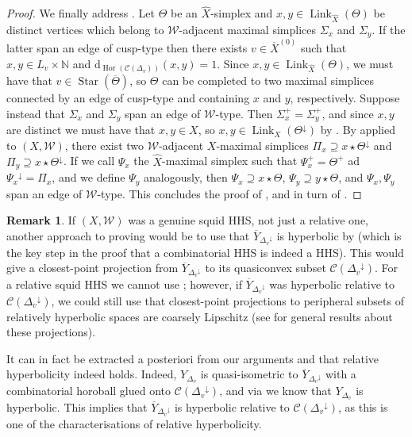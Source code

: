 \documentclass[svgnames]{amsart}
\theoremstyle{plain}
\theoremstyle{definition}
\newtheorem{rem}[thm]{Remark}
\newcommand{\C}[1]{\mathcal{C}(#1)}
\newcommand{\dist}{\mathrm{d}}
\newcommand{\link}[2]{\operatorname{Link}_{#1}\left(#2\right)}
\newcommand{\W}{\mathcal{W}}
\newcommand{\CStar}[1]{\operatorname{Star}\left(#1\right)}
\newcommand{\Hor}[1]{\operatorname{Hor}\left(#1\right)}
\newcommand{\down}[1]{{#1}^{\downarrow}}
\newcommand{\squid}[1]{squid}
\newcommand{\N}{\mathbb{N}}
\renewcommand{\hat}{\widehat}
\newcommand{\ov}[1]{\overline{#1}}
\begin{document}
\begin{proof}
We finally address . Let $\Theta$ be an $\hat X$-simplex and $x,y\in \link{\hat X}{\Theta}$ be distinct vertices which belong to $\W$-adjacent maximal simplices $\Sigma_x$ and $\Sigma_y$. If the latter span an edge of cusp-type then there exists $v\in \ov X^{(0)}$ such that $x,y\in L_v\times \N$ and $\dist_{\Hor{\C{\Delta_v}}}(x,y)=1$. Since $x,y\in \link{\hat X}{\Theta}$, we must have that $v\in \CStar{\ov\Theta}$, so $\Theta$ can be completed to two maximal simplices connected by an edge of cusp-type and containing $x$ and $y$, respectively. Suppose instead that $\Sigma_x$ and $\Sigma_y$ span an edge of $\W$-type. Then $\Sigma_x^+=\Sigma_y^+$, and since $x,y$ are distinct we must have that $x,y\in X$, so $x,y\in \link{X}{\down{\Theta}}$ by . By  applied to $(X,\W)$, there exist two $\W$-adjacent $X$-maximal simplices $\Pi_x\supseteq x\star \down{\Theta}$ and $\Pi_y\supseteq x\star \down{\Theta}$. If we call $\Psi_x$ the $\hat X$-maximal simplex such that $\Psi_x^+=\Theta^+$ ad $\down{\Psi_x}=\Pi_x$, and we define $\Psi_y$ analogously, then $\Psi_x\supseteq x\star \Theta$, $\Psi_y\supseteq y\star \Theta$, and $\Psi_x,\Psi_y$ span an edge of $\W$-type. This concludes the proof of , and in turn of .
\end{proof}

\begin{rem}
    If $(X,\W)$ was a genuine \squid{} HHS, not just a relative one, another approach to proving  would be to use that $\ov Y_{\down{\Delta_v}}$ is hyperbolic by \cite[Proposition 3.3]{BHMS} (which is the key step in the proof that a combinatorial HHS is indeed a HHS). This would give a closest-point projection from $\ov Y_{\down{\Delta_v}}$ to its quasiconvex subset $\C{\down{\Delta_v}}$. For a relative \squid{} HHS we cannot use \cite{BHMS}; however, if $\ov Y_{\down{\Delta_v}}$ was hyperbolic relative to $\C{\down{\Delta_v}}$, we could still use that closest-point projections to peripheral subsets of relatively hyperbolic spaces are coarsely Lipschitz (see \cite{Sisto_proj_relhyp} for general results about these projections). 
    
    It can in fact be extracted a posteriori from our arguments and \cite[Proposition 3.3]{BHMS} that relative hyperbolicity indeed holds. Indeed, $Y_{\Delta_v}$ is quasi-isometric to $\ov Y_{\down{\Delta_v}}$ with a combinatorial horoball glued onto $\C{\down{\Delta_v}}$, and via \cite[Proposition 3.3]{BHMS} we know that $Y_{\Delta_v}$ is hyperbolic. This implies that $\ov Y_{\down{\Delta_v}}$ is hyperbolic relative to $\C{\down{\Delta_v}}$, as this is one of the characterisations of relative hyperbolicity. 
\end{rem}
\end{document}
